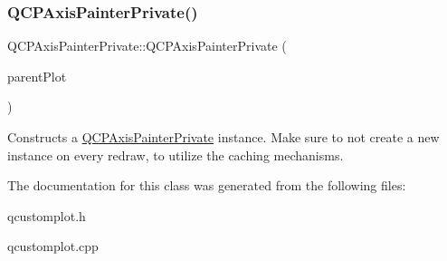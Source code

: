 \subsubsection{\texorpdfstring{Q\+C\+P\+Axis\+Painter\+Private()}{QCPAxisPainterPrivate()}}
{\footnotesize\ttfamily Q\+C\+P\+Axis\+Painter\+Private\+::\+Q\+C\+P\+Axis\+Painter\+Private (\begin{DoxyParamCaption}\item[{\hyperlink{classQCustomPlot}{Q\+Custom\+Plot} $\ast$}]{parent\+Plot }\end{DoxyParamCaption})\hspace{0.3cm}{\ttfamily [explicit]}}

Constructs a \hyperlink{classQCPAxisPainterPrivate}{Q\+C\+P\+Axis\+Painter\+Private} instance. Make sure to not create a new instance on every redraw, to utilize the caching mechanisms. 

The documentation for this class was generated from the following files\+:\begin{DoxyCompactItemize}
\item 
qcustomplot.\+h\item 
qcustomplot.\+cpp\end{DoxyCompactItemize}
